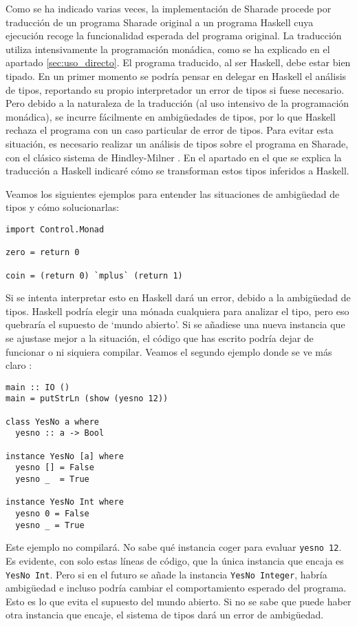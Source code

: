 \documentclass[class=article, crop=false]{standalone}
\begin{document}
Como se ha indicado varias veces, la implementación de Sharade procede por traducción de un
programa Sharade original a un programa Haskell cuya ejecución recoge la funcionalidad
esperada del programa original. La traducción utiliza intensivamente la programación
monádica, como se ha explicado en el apartado \ref{sec:uso_directo}. El programa traducido,
al ser Haskell, debe estar bien tipado. En un primer momento se podría pensar en delegar en
Haskell el análisis de tipos, reportando su propio interpretador un error de tipos si fuese
necesario. Pero debido a la naturaleza de la traducción (al uso intensivo de la programación
monádica), se incurre fácilmente en ambigüedades de tipos, por lo que Haskell rechaza el
programa con un caso particular de error de tipos. Para evitar esta situación, es necesario
realizar un análisis de tipos sobre el programa en Sharade, con el clásico sistema de
Hindley-Milner \cite{hindley1969principal}. En el apartado en el que se explica la traducción
a Haskell indicaré cómo se transforman estos tipos inferidos a Haskell.

Veamos los siguientes ejemplos para entender las situaciones de ambigüedad de tipos y cómo
solucionarlas:

\begin{verbatim}
import Control.Monad

zero = return 0

coin = (return 0) `mplus` (return 1)
\end{verbatim}

Si se intenta interpretar esto en Haskell dará un error, debido a la ambigüedad de tipos.
Haskell podría elegir una mónada cualquiera para analizar el tipo, pero eso quebraría el
supuesto de `mundo abierto'. Si se añadiese una nueva instancia que se ajustase mejor a la
situación, el código que has escrito podría dejar de funcionar o ni siquiera compilar. Veamos
el segundo ejemplo donde se ve más claro \cite{Lipovaca:2011:LYH:2018642}:

\begin{verbatim}
main :: IO ()
main = putStrLn (show (yesno 12))

class YesNo a where
  yesno :: a -> Bool
  
instance YesNo [a] where
  yesno [] = False
  yesno _  = True

instance YesNo Int where
  yesno 0 = False
  yesno _ = True
\end{verbatim}

Este ejemplo no compilará. No sabe qué instancia coger para evaluar \verb`yesno 12`. Es
evidente, con solo estas líneas de código, que la única instancia que encaja es
\verb`YesNo Int`. Pero si en el futuro se añade la instancia \verb`YesNo Integer`, habría
ambigüedad e incluso podría cambiar el comportamiento esperado del programa. Esto es lo que
evita el supuesto del mundo abierto. Si no se sabe que puede haber otra instancia que encaje,
el sistema de tipos dará un error de ambigüedad.
\end{document}
